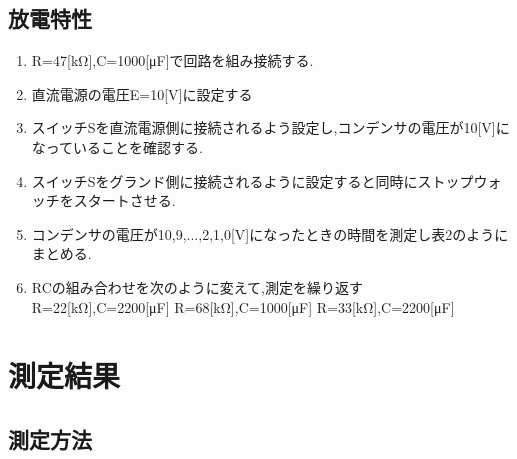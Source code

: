 \documentclass[titlepage]{jarticle}
\begin{document}
\subsection{放電特性}
\begin{enumerate}
    \item R=47[kΩ],C=1000[μF]で回路を組み接続する.
    \item 直流電源の電圧E=10[V]に設定する
    \item スイッチSを直流電源側に接続されるよう設定し,コンデンサの電圧が10[V]になっていることを確認する.
    \item スイッチSをグランド側に接続されるように設定すると同時にストップウォッチをスタートさせる.
    \item コンデンサの電圧が10,9,...,2,1,0[V]になったときの時間を測定し表2のようにまとめる.
    \item RCの組み合わせを次のように変えて,測定を繰り返す\\R=22[kΩ],C=2200[μF] R=68[kΩ],C=1000[μF] R=33[kΩ],C=2200[μF]
\end{enumerate}

\section{測定結果}
\subsection{測定方法}
\end{document}
